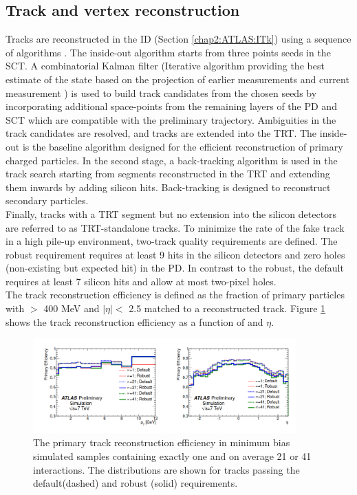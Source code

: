 \subsection{Track and vertex reconstruction}
\label{chap2:Objects:Trk}
Tracks are reconstructed in the ID (Section \ref{chap2:ATLAS:ITk}) using a sequence of algorithms \cite{Track_Reco, New_Trk}. The inside-out algorithm starts from three points seeds in the SCT. A combinatorial Kalman filter (Iterative algorithm providing the best estimate of the state based on the projection of earlier measurements and current measurement \cite{Kalman}) is used to build track candidates from the chosen seeds by incorporating additional space-points from the remaining layers of the PD and SCT which are compatible with the preliminary trajectory. Ambiguities in the track candidates are resolved, and tracks are extended into the TRT. The inside-out is the baseline algorithm designed for the efficient reconstruction of primary charged particles. In the second stage, a back-tracking algorithm is used in the track search starting from segments reconstructed in the TRT and extending them inwards by adding silicon hits. Back-tracking is designed to reconstruct secondary particles. \\
Finally, tracks with a TRT segment but no extension into the silicon detectors are referred to as TRT-standalone tracks. To minimize the rate of the fake track in a high pile-up environment, two-track quality requirements are defined. The robust requirement requires at least 9 hits in the silicon detectors and zero holes (non-existing but expected hit) in the PD. In contrast to the robust, the default requires at least 7 silicon hits and allow at most two-pixel holes.\\
The track reconstruction efficiency is defined as the fraction of primary particles with \pT $>$ 400 MeV and $|\eta|<$ 2.5 matched to a reconstructed track. Figure \ref{fig:chap2:Objects:Trk:Eff} shows the track reconstruction efficiency as a function of \pT and $\eta$.
\begin{figure}[htbp]
    \centering
    \includegraphics[width=0.9\textwidth]{Ch2/Img/Track_reco_eff.png}
    \caption{The primary track reconstruction efficiency in minimum bias simulated samples containing exactly one and on average 21 or 41 interactions. The distributions are shown for tracks passing the default(dashed) and robust (solid) requirements.}
    \label{fig:chap2:Objects:Trk:Eff}
\end{figure}
